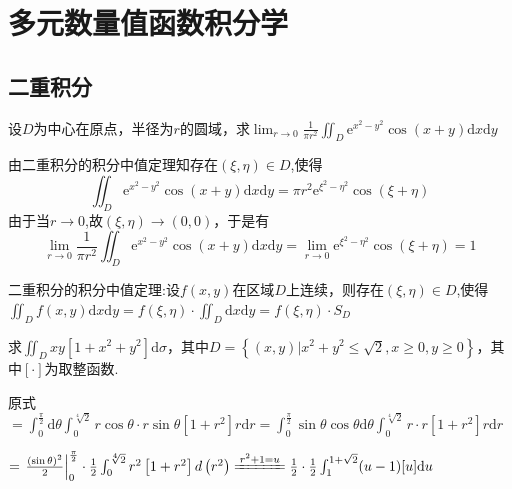 \chapter{多元数量值函数积分学}\label{cha:5}
\section{二重积分}%
\begin{xiti}
	\item 设$D$为中心在原点，半径为$r$的圆域，求$\lim _{r \rightarrow 0} \frac{1}{\pi r^{2}} \iint_{D} \mathrm{e}^{x^{2}-y^{2}} \cos (x+y) \mathrm{d} x \mathrm{d} y$
	\begin{solution}
		由二重积分的积分中值定理知存在$(\xi, \eta) \in D$,使得
		\[\iint_{D} \mathrm{e}^{x^{2}-y^{2}} \cos (x+y) \mathrm{d} x \mathrm{d} y=\pi r^{2} \mathrm{e}^{\xi^{2}-\eta^{2}} \cos (\xi+\eta)\]由于当$r \rightarrow 0$,故$(\xi, \eta) \rightarrow(0,0)$，于是有\[\lim _{r \rightarrow 0} \frac{1}{\pi r^{2}} \iint_{D} \mathrm{e}^{x^{2}-y^{2}} \cos (x+y) \mathrm{d} x \mathrm{d} y=\lim _{r \rightarrow 0} \mathrm{e}^{\xi^{2}-\eta^{2}} \cos (\xi+\eta)=1\]
		\begin{note}
			二重积分的积分中值定理:设$f(x,y)$在区域$D$上连续，则存在$(\xi, \eta) \in D$,使得$\iint_{D} f(x,y) \mathrm{d} x \mathrm{d} y= f(\xi,\eta) \cdot \iint_{D} \mathrm{d} x \mathrm{d} y= f(\xi,\eta) \cdot S_{D}$
		\end{note}
	\end{solution}
	\item 求$\iint_{D} x y\left[1+x^{2}+y^{2}\right] \mathrm{d} \sigma$，其中$D=\left\{(x, y) | x^{2}+y^{2} \leqslant \sqrt{2}, x \geqslant 0, y \geqslant 0\right\}$，其中$[\cdot]$为取整函数.
	\begin{solution}
		原式$=\int_{0}^{\frac{\pi}{2}} \mathrm{d} \theta \int_{0}^{\sqrt[4]{2}} r \cos \theta \cdot r \sin \theta\left[1+r^{2}\right] r \mathrm{d} r=\int_{0}^{\frac{\pi}{2}} \sin \theta \cos \theta \mathrm{d} \theta \int_{0}^{\sqrt[4]{2}} r \cdot r\left[1+r^{2}\right] r \mathrm{d} r$
		
		$=\left.\frac{(\sin \theta)^{2}}{2}\right|_{0} ^{\frac{\pi}{2}} \cdot \frac{1}{2} \int_{0}^{\sqrt[4]{2}} r^{2}\left[1+r^{2}\right]d\left(r^{2}\right) \xlongequal{{r^2} + 1 = u} \frac{1}{2} \cdot \frac{1}{2} \int_{1}^{1+\sqrt{2}}(u-1)[u] \mathrm{d} u $
				

\end{solution}
\end{xiti}
